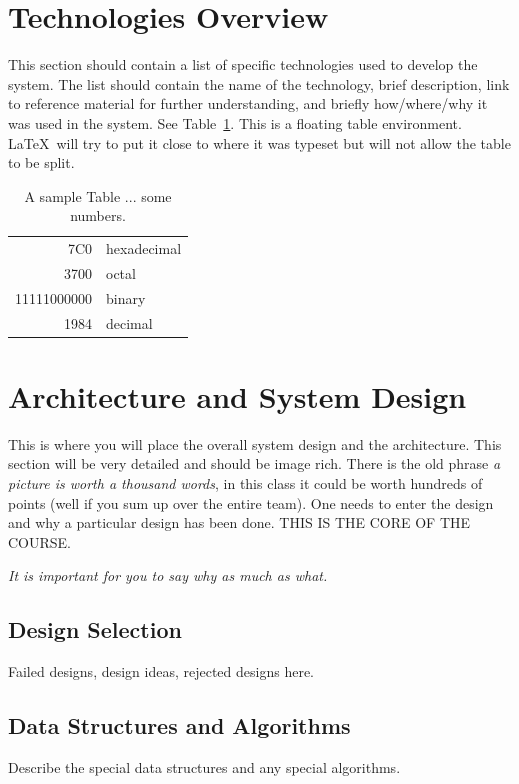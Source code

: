 \section{Technologies Overview}
This section should contain a list of specific technologies used to
develop the system.  The list should contain the name of the
technology, brief description, link to reference material for further
understanding, and briefly how/where/why it was used in the system.
See Table~\ref{somenumbers}.  This is a floating table environment.
\LaTeX\ will try to put it close to where it was typeset but will not
allow the table to be split.

\begin{table}[tbh]
\caption{A sample Table ... some numbers. \label{somenumbers}}
\begin{center}
\begin{tabular}{|r|l|}
  \hline
  7C0 & hexadecimal \\
  3700 & octal \\ \cline{2-2}
  11111000000 & binary \\
  \hline \hline
  1984 & decimal \\
  \hline
\end{tabular}
\end{center}
\end{table}


 \section{Architecture and System Design}
This is where you will place the overall system design and the architecture.   This section will be very detailed and should be image rich.  There is the old phrase {\it a picture is worth a thousand words}, in this class it could be worth hundreds of points (well if you sum up over the entire team).   One needs to enter the design and why a particular design has been done.   THIS IS THE CORE OF THE COURSE.    
 
 
 {\it It is important for you to say why as much as what.   }
 
   \subsection{Design Selection}
 Failed designs, design ideas, rejected designs here.
 
 \subsection{Data Structures and Algorithms}
 Describe the special data structures and any special algorithms.
 

